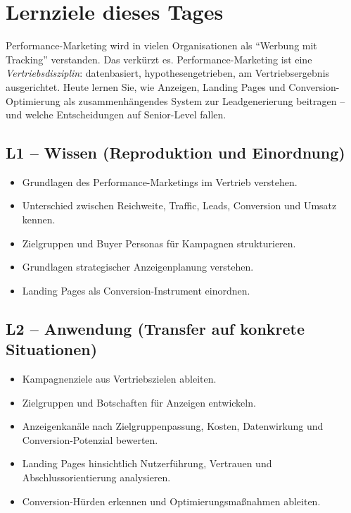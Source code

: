 \documentclass[11pt,a4paper,oneside]{article}
\begin{document}
\section*{Lernziele dieses Tages}
\thispagestyle{plain}

\noindent Performance-Marketing wird in vielen Organisationen als ``Werbung mit Tracking'' verstanden. Das verkürzt es. Performance-Marketing ist eine \emph{Vertriebsdisziplin}: datenbasiert, hypothesengetrieben, am Vertriebsergebnis ausgerichtet. Heute lernen Sie, wie Anzeigen, Landing Pages und Conversion-Optimierung als zusammenhängendes System zur Leadgenerierung beitragen -- und welche Entscheidungen auf Senior-Level fallen.

\subsection*{L1 -- Wissen (Reproduktion und Einordnung)}
\begin{itemize}
  \item Grundlagen des Performance-Marketings im Vertrieb verstehen.
  \item Unterschied zwischen Reichweite, Traffic, Leads, Conversion und Umsatz kennen.
  \item Zielgruppen und Buyer Personas für Kampagnen strukturieren.
  \item Grundlagen strategischer Anzeigenplanung verstehen.
  \item Landing Pages als Conversion-Instrument einordnen.
\end{itemize}

\subsection*{L2 -- Anwendung (Transfer auf konkrete Situationen)}
\begin{itemize}
  \item Kampagnenziele aus Vertriebszielen ableiten.
  \item Zielgruppen und Botschaften für Anzeigen entwickeln.
  \item Anzeigenkanäle nach Zielgruppenpassung, Kosten, Datenwirkung und Conversion-Potenzial bewerten.
  \item Landing Pages hinsichtlich Nutzerführung, Vertrauen und Abschlussorientierung analysieren.
  \item Conversion-Hürden erkennen und Optimierungsmaßnahmen ableiten.
\end{itemize}
\end{document}
